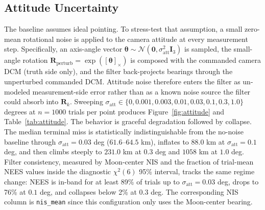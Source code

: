 \documentclass[10pt,twocolumn]{article}
\newcommand{\vect}[1]{\mathbf{#1}}
\newcommand{\mat}[1]{\mathbf{#1}}
\newcommand{\chisq}{\chi^2}
\begin{document}
\begin{table}[t]
\centering
\caption{Pass rates and distribution summaries for the four central-figure populations at the three marked tolerances.  All four populations are $n=1000$ matched-seed Monte Carlo trials.  The uncorrected reference uses $\texttt{miss\_uncorrected}$ from the same trials as the CR3BP baseline (no midcourse burn applied).}
\label{tab:central-pass}
\scriptsize
{}
\end{table}

\subsection{Attitude Uncertainty}
\label{sec:realism-attitude}
The baseline assumes ideal pointing.  To stress-test that assumption, a small zero-mean rotational noise is applied to the camera attitude at every measurement step.  Specifically, an axis-angle vector $\vect{\theta}\sim\mathcal{N}(\vect{0},\sigma_\text{att}^2\mat{I}_3)$ is sampled, the small-angle rotation $\mat{R}_\text{perturb}=\exp([\vect{\theta}]_\times)$ is composed with the commanded camera DCM (truth side only), and the filter back-projects bearings through the unperturbed commanded DCM.  Attitude noise therefore enters the filter as un-modeled measurement-side error rather than as a known noise source the filter could absorb into $\mat{R}_k$.  Sweeping $\sigma_\text{att}\in\{0,0.001,0.003,0.01,0.03,0.1,0.3,1.0\}$ degrees at $n=1000$ trials per point produces Figure~\ref{fig:attitude} and Table~\ref{tab:attitude}.  The behavior is graceful degradation followed by collapse.  The median terminal miss is statistically indistinguishable from the no-noise baseline through $\sigma_\text{att}=0.03$ deg ($61.6$--$64.5$ km), inflates to $88.0$ km at $\sigma_\text{att}=0.1$ deg, and then climbs steeply to $231.0$ km at $0.3$ deg and $1058$ km at $1.0$ deg.  Filter consistency, measured by Moon-center NIS and the fraction of trial-mean NEES values inside the diagnostic $\chisq(6)$ 95\% interval, tracks the same regime change: NEES is in-band for at least 89\% of trials up to $\sigma_\text{att}=0.03$ deg, drops to 76\% at $0.1$ deg, and collapses below 2\% at $0.3$ deg.  The corresponding NIS column is \texttt{nis\_mean} since this configuration only uses the Moon-center bearing.
\end{document}
